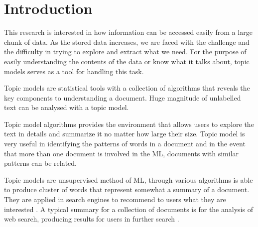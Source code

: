 \chapter{Introduction}

%
%
%

This research is interested in how information can be accessed easily from a large chunk of data. As the stored data increases, we are faced with the challenge and the difficulty in trying to explore and extract what we need. For the purpose of easily understanding the contents of the data or know what it talks about, topic models serves as a tool for handling this task.

Topic models are statistical tools with a collection of algorithms that reveals the key components to understanding a document. Huge magnitude of unlabelled text can be analysed with a topic model.

Topic model algorithms provides the environment that allows   users to explore the text in details and summarize it no matter how large their size. Topic model is very useful in identifying the patterns of words in a document and in the event that more than one document is involved in the ML, documents with similar patterns can be related. 

Topic models are unsupervised method of ML, through various algorithms is able to produce cluster of words that represent somewhat a summary of a document. They are applied in search engines to recommend to users what they are interested . A typical summary for a collection of documents is for the analysis of web search, producing results for users in further search \citep{turpin2007fast} . %

